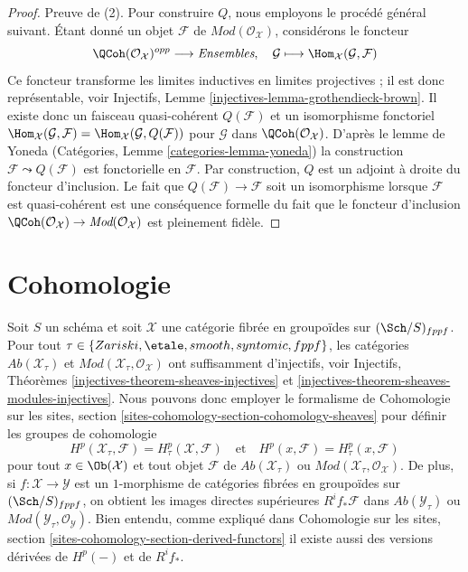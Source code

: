 \begin{proof}
\medskip\noindent
Preuve de (2). Pour construire $Q$, nous employons le procédé général suivant.
Étant donné un objet $\mathcal{F}$ de $\textit{Mod}(\mathcal{O}_\mathcal{X})$,
considérons le foncteur
$$
\QCoh(\mathcal{O}_\mathcal{X})^{opp}
\longrightarrow
\textit{Ensembles},
\quad
\mathcal{G}
\longmapsto
\Hom_\mathcal{X}(\mathcal{G}, \mathcal{F})
$$
Ce foncteur transforme les limites inductives en limites projectives ;
il est donc représentable, voir
Injectifs, Lemme \ref{injectives-lemma-grothendieck-brown}.
Il existe donc un faisceau quasi-cohérent $Q(\mathcal{F})$
et un isomorphisme fonctoriel
$\Hom_\mathcal{X}(\mathcal{G}, \mathcal{F}) =
\Hom_\mathcal{X}(\mathcal{G}, Q(\mathcal{F}))$
pour $\mathcal{G}$ dans $\QCoh(\mathcal{O}_\mathcal{X})$.
D'après le lemme de Yoneda
(Catégories, Lemme \ref{categories-lemma-yoneda})
la construction $\mathcal{F} \leadsto Q(\mathcal{F})$ est
fonctorielle en $\mathcal{F}$. Par construction, $Q$ est un adjoint
à droite du foncteur d'inclusion.
Le fait que $Q(\mathcal{F}) \to \mathcal{F}$ soit un isomorphisme
lorsque $\mathcal{F}$ est quasi-cohérent est une conséquence formelle du fait
que le foncteur d'inclusion
$\QCoh(\mathcal{O}_\mathcal{X}) \to
\textit{Mod}(\mathcal{O}_\mathcal{X})$
est pleinement fidèle.
\end{proof}








\section{Cohomologie}
\label{section-cohomology-general}

\noindent
Soit $S$ un schéma et soit $\mathcal{X}$ une catégorie fibrée en groupoïdes
sur $(\Sch/S)_{fppf}$. Pour tout $\tau \in \{Zariski, \etale, smooth,
syntomic, fppf\}$, les catégories $\textit{Ab}(\mathcal{X}_\tau)$ et
$\textit{Mod}(\mathcal{X}_\tau, \mathcal{O}_\mathcal{X})$ ont
suffisamment d'injectifs, voir
Injectifs, Théorèmes \ref{injectives-theorem-sheaves-injectives} et
\ref{injectives-theorem-sheaves-modules-injectives}.
Nous pouvons donc employer le formalisme de
Cohomologie sur les sites, section \ref{sites-cohomology-section-cohomology-sheaves}
pour définir les groupes de cohomologie
$$
H^p(\mathcal{X}_\tau, \mathcal{F}) = H^p_\tau(\mathcal{X}, \mathcal{F})
\quad\text{et}\quad
H^p(x, \mathcal{F}) = H^p_\tau(x, \mathcal{F})
$$
pour tout $x \in \Ob(\mathcal{X})$ et tout objet $\mathcal{F}$ de
$\textit{Ab}(\mathcal{X}_\tau)$ ou
$\textit{Mod}(\mathcal{X}_\tau, \mathcal{O}_\mathcal{X})$. De plus, si
$f : \mathcal{X} \to \mathcal{Y}$ est un $1$-morphisme de catégories fibrées
en groupoïdes sur $(\Sch/S)_{fppf}$, on obtient les images directes
supérieures $R^if_*\mathcal{F}$ dans $\textit{Ab}(\mathcal{Y}_\tau)$ ou
$\textit{Mod}(\mathcal{Y}_\tau, \mathcal{O}_\mathcal{Y})$.
Bien entendu, comme expliqué dans
Cohomologie sur les sites, section \ref{sites-cohomology-section-derived-functors}
il existe aussi des versions dérivées de $H^p(-)$ et de $R^if_*$.

